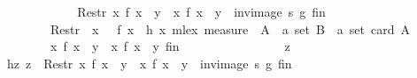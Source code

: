\begin{isabellebody}
\ \ \ \ \isamarkupfalse%
{\isacharminus}{\kern0pt}\isanewline
\ \ \ \ \ \ \isamarkupfalse%
\ {\isachardoublequoteopen}Restr\ {\isacharparenleft}{\kern0pt}{\isacharbraceleft}{\kern0pt}x{\isachardot}{\kern0pt}\ f\ x\ {\isacharequal}{\kern0pt}\ y{\isacharbraceright}{\kern0pt}\ {\isasymtimes}\ {\isacharbraceleft}{\kern0pt}x{\isachardot}{\kern0pt}\ f\ x\ {\isacharequal}{\kern0pt}\ y{\isacharbraceright}{\kern0pt}\ {\isasyminter}\ {\isacharparenleft}{\kern0pt}inv{\isacharunderscore}{\kern0pt}image\ s\ g{\isacharparenright}{\kern0pt}{\isacharparenright}{\kern0pt}\ {\isacharquery}{\kern0pt}fin\ {\isasymsubseteq}\ \isanewline
\ \ \ \ \ \ \ \ Restr\ {\isacharparenleft}{\kern0pt}{\isacharparenleft}{\kern0pt}{\isacharparenleft}{\kern0pt}{\isasymlambda}\ x{\isachardot}{\kern0pt}\ {}\ {\isacharasterisk}{\kern0pt}\ f\ x\ {\isacharminus}{\kern0pt}\ h\ x{\isacharparenright}{\kern0pt}\ {\isacharless}{\kern0pt}{\isacharasterisk}{\kern0pt}mlex{\isacharasterisk}{\kern0pt}{\isachargreater}{\kern0pt}\ measure\ {\isacharparenleft}{\kern0pt}{\isasymlambda}\ {\isacharparenleft}{\kern0pt}A\ {\isacharcolon}{\kern0pt}{\isacharcolon}{\kern0pt}\ {\isacharprime}{\kern0pt}a\ set{\isacharcomma}{\kern0pt}\ B\ {\isacharcolon}{\kern0pt}{\isacharcolon}{\kern0pt}\ {\isacharprime}{\kern0pt}a\ set{\isacharparenright}{\kern0pt}{\isachardot}{\kern0pt}\ card\ A{\isacharparenright}{\kern0pt}{\isacharparenright}{\kern0pt}\ {\isasyminter}\ \isanewline
\ \ \ \ \ \ \ \ {\isacharbraceleft}{\kern0pt}x{\isachardot}{\kern0pt}\ f\ x\ {\isacharequal}{\kern0pt}\ y{\isacharbraceright}{\kern0pt}\ {\isasymtimes}\ {\isacharbraceleft}{\kern0pt}x{\isachardot}{\kern0pt}\ f\ x\ {\isacharequal}{\kern0pt}\ y{\isacharbraceright}{\kern0pt}{\isacharparenright}{\kern0pt}\ {\isacharquery}{\kern0pt}fin{\isachardoublequoteclose}\isanewline
\ \ \ \ \ \ \isamarkupfalse%
\isanewline
\ \ \ \ \ \ \ \ \isamarkupfalse%
\ z\ \isamarkupfalse%
\ hz{\isacharcolon}{\kern0pt}\ {\isachardoublequoteopen}z\ {\isasymin}\ Restr\ {\isacharparenleft}{\kern0pt}{\isacharbraceleft}{\kern0pt}x{\isachardot}{\kern0pt}\ f\ x\ {\isacharequal}{\kern0pt}\ y{\isacharbraceright}{\kern0pt}\ {\isasymtimes}\ {\isacharbraceleft}{\kern0pt}x{\isachardot}{\kern0pt}\ f\ x\ {\isacharequal}{\kern0pt}\ y{\isacharbraceright}{\kern0pt}\ {\isasyminter}\ {\isacharparenleft}{\kern0pt}inv{\isacharunderscore}{\kern0pt}image\ s\ g{\isacharparenright}{\kern0pt}{\isacharparenright}{\kern0pt}\ {\isacharquery}{\kern0pt}fin{\isachardoublequoteclose}\isanewline
\ \ \ \ \ \ \ \ \isamarkupfalse%

\end{isabellebody}
